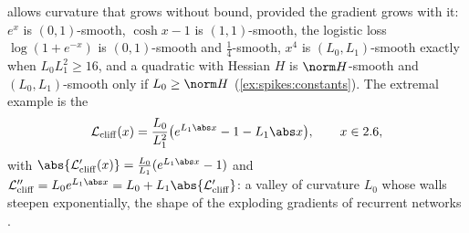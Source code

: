 \begin{refsection}

 allows curvature that grows without bound, provided the gradient grows with it: $e^x$ is $(0,1)$-smooth, $\cosh x-1$ is $(1,1)$-smooth, the logistic loss $\log(1+e^{-x})$ is $(0,1)$-smooth and $\frac14$-smooth, $x^4$ is $(L_0,L_1)$-smooth exactly when $L_0L_1^2\ge16$, and a quadratic with Hessian $H$ is $\norm H$-smooth and $(L_0,L_1)$-smooth only if $L_0\ge\norm H$ (\cref{ex:spikes:constants}). The extremal example is the 
\begin{equation}\label{eq:spikes:cliff}
  \spikescliff(x)=\frac{L_0}{L_1^2}\bigl(e^{L_1\abs x}-1-L_1\abs x\bigr),\qquad x\in\R,
\end{equation}
with $\abs{\spikescliff'(x)}=\frac{L_0}{L_1}(e^{L_1\abs x}-1)$ and $\spikescliff''=L_0e^{L_1\abs x}=L_0+L_1\abs{\spikescliff'}$: a valley of curvature $L_0$ whose walls steepen exponentially, the shape of the exploding gradients of recurrent networks \parencite{BengioSimardFrasconi1994,PascanuMikolovBengio2013}.


\end{refsection}
